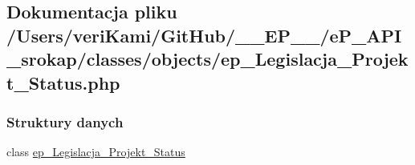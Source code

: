 \hypertarget{ep___legislacja___projekt___status_8php}{\subsection{Dokumentacja pliku /\-Users/veri\-Kami/\-Git\-Hub/\-\_\-\-\_\-\-E\-P\-\_\-\-\_\-/e\-P\-\_\-\-A\-P\-I\-\_\-srokap/classes/objects/ep\-\_\-\-Legislacja\-\_\-\-Projekt\-\_\-\-Status.php}
\label{ep___legislacja___projekt___status_8php}
}
\subsubsection*{Struktury danych}
\begin{DoxyCompactItemize}
\item 
class \hyperlink{classep___legislacja___projekt___status}{ep\-\_\-\-Legislacja\-\_\-\-Projekt\-\_\-\-Status}
\end{DoxyCompactItemize}
